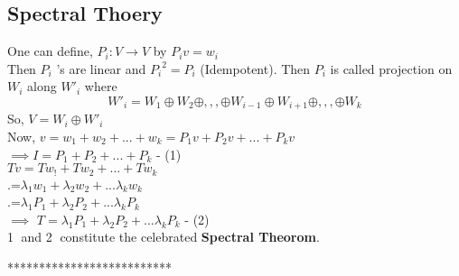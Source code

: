 \documentclass[12pt]{article}
\theoremstyle{definition}
\begin{document}
	 \subsection{Spectral Thoery}
	 One can define, $P_i:V\to V$ by $P_iv = w_i$\\
	 Then $P_i$ 's are linear and ${P_i}^2 = P_i$ (Idempotent). Then $P_i$ is called projection on $W_i$ along ${W\prime}_i$ where $${W\prime}_i= W_1\oplus W_2\oplus,,,\oplus W_{i-1}\oplus W_{i+1}\oplus,,,\oplus W_k$$
	 So, \space $V = W_i\oplus {W\prime}_i$\\
	 Now, $v=w_1+w_2+...+w_k = P_1 v+P_2 v+...+P_k v$\\
	 $\implies \boxed{I = P_1+P_2+...+P_k}$ - (1)
	 \\
	 $Tv = Tw_!+Tw_2+...+Tw_k$\\
	 .\hspace{0.5cm}=$\lambda_{1}w_1+\lambda_{2}w_2+...\lambda_{k}w_k$\\
	 .\hspace{0.5cm}=$\lambda_{1}P_1+\lambda_{2}P_2+...\lambda_{k}P_k$\\
	 $\implies$
	 $\boxed{T= \lambda_{1}P_1+\lambda_{2}P_2+...\lambda_{k}P_k}$ - (2)\\
	 \textcircled{1} and \textcircled{2} constitute the celebrated \textbf{Spectral Theorom}.
	 \\
	  					\begin{center}
	  						**************************
	  					\end{center}
	  
\end{document}
